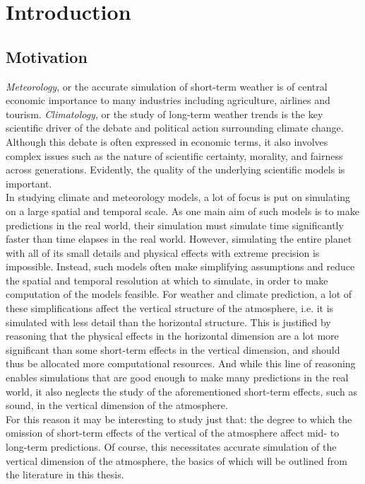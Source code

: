 
\chapter{Introduction}\label{chapter:introduction}
\section{Motivation}\label{sec:motivation}
\emph{Meteorology}, or the accurate simulation of short-term weather is of central economic importance to many industries including agriculture, airlines and tourism.
\emph{Climatology}, or the study of long-term weather trends is the key scientific driver of the debate and political action surrounding climate change.
Although this debate is often expressed in economic terms, it also involves complex issues such as the nature of scientific certainty, morality, and fairness across generations.
Evidently, the quality of the underlying scientific models is important.\\
In studying climate and meteorology models, a lot of focus is put on simulating on a large spatial and temporal scale.
As one main aim of such models is to make predictions in the real world, their simulation must simulate time significantly faster than time elapses in the real world.
However, simulating the entire planet with all of its small details and physical effects with extreme precision is impossible.
Instead, such models often make simplifying assumptions and reduce the spatial and temporal resolution at which to simulate, in order to make computation of the models feasible.
For weather and climate prediction, a lot of these simplifications affect the vertical structure of the atmosphere, i.e. it is simulated with less detail than the horizontal structure.
This is justified by reasoning that the physical effects in the horizontal dimension are a lot more significant than some short-term effects in the vertical dimension, and should thus be allocated more computational resources.
And while this line of reasoning enables simulations that are good enough to make many predictions in the real world, it also neglects the study of the aforementioned short-term effects, such as sound, in the vertical dimension of the atmosphere.\\
For this reason it may be interesting to study just that: the degree to which the omission of short-term effects of the vertical of the atmosphere affect mid- to long-term predictions.
Of course, this necessitates accurate simulation of the vertical dimension of the atmosphere, the basics of which will be outlined from the literature in this thesis.

